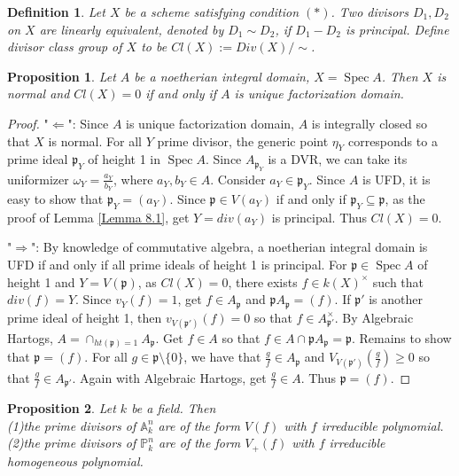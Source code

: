 \documentclass{ctexart}
\newtheorem{definition}{Definition}[section]
\newtheorem{proposition}{Proposition}[section]
\newcommand{\spec}{\operatorname{Spec}}
\begin{document}
\begin{definition}
    Let $X$ be a scheme satisfying condition $(\ast)$.
    Two divisors $D_{1}, D_{2}$ on $X$ are linearly equivalent, denoted by $D_{1} \sim D_{2}$, if $D_{1} - D_{2}$ is principal.
    Define divisor class group of $X$ to be $Cl(X) := Div(X)/\sim$.
\end{definition}
\begin{proposition}
    Let $A$ be a noetherian integral domain, $X = \spec A$.
    Then $X$ is normal and $Cl(X) = 0$ if and only if $A$ is unique factorization domain.
    \label{Proposition 8.1}
\end{proposition}
\begin{proof}
    "$\Leftarrow$": Since $A$ is unique factorization domain, $A$ is integrally closed so that $X$ is normal.
    For all $Y$ prime divisor, the generic point $\eta_{Y}$ corresponds to a prime ideal $\mathfrak{p}_{Y}$ of height 1 in $\spec A$.
    Since $A_{\mathfrak{p}_{Y}}$ is a DVR, we can take its uniformizer $\omega_{Y} = \frac{a_{Y}}{b_{Y}}$, where $a_{Y},b_{Y}\in A$.
    Consider $a_{Y}\in \mathfrak{p}_{Y}$.
    Since $A$ is UFD, it is easy to show that $\mathfrak{p}_{Y} = (a_{Y})$.
    Since $\mathfrak{p}\in V(a_{Y})$ if and only if $\mathfrak{p}_{Y} \subseteq \mathfrak{p}$,
    as the proof of Lemma \ref{Lemma 8.1}, get $Y = div(a_{Y})$ is principal.
    Thus $Cl(X) = 0$.
    \par
    "$\Rightarrow$": By knowledge of commutative algebra, a noetherian integral domain is UFD if and only if all prime ideals of height 1 is principal.
    For $\mathfrak{p}\in \spec A$ of height 1 and $Y = V(\mathfrak{p})$, as $Cl(X) = 0$, 
    there exists $f\in k(X)^{\times}$ such that $div(f) = Y$.
    Since $v_{Y}(f) = 1$, get $f\in A_{\mathfrak{p}}$ and $\mathfrak{p}A_{\mathfrak{p}} = (f)$.
    If $\mathfrak{p}'$ is another prime ideal of height 1, then $v_{V(\mathfrak{p}')}(f) = 0$ so that $f\in A_{\mathfrak{p}'}^{\times}$.
    By Algebraic Hartogs, $A = \cap_{ht(\mathfrak{p}) = 1} A_{\mathfrak{p}}$.
    Get $f\in A$ so that $f\in A \cap \mathfrak{p}A_{\mathfrak{p}} = \mathfrak{p}$.
    Remains to show that $\mathfrak{p} = (f)$.
    For all $g\in \mathfrak{p} \setminus \{0\}$, we have that $\frac{g}{f}\in A_{\mathfrak{p}}$ and $V_{V(\mathfrak{p}')}(\frac{g}{f}) \ge 0$ so that $\frac{g}{f}\in A_{\mathfrak{p}'}$.
    Again with Algebraic Hartogs, get $\frac{g}{f}\in A$.
    Thus $\mathfrak{p} = (f)$.
\end{proof}
\begin{proposition}
    Let $k$ be a field.
    Then \\ 
    (1)the prime divisors of $\mathbb{A}_{k}^{n}$ are of the form $V(f)$ with $f$ irreducible polynomial. \\
    (2)the prime divisors of $\mathbb{P}_{k}^{n}$ are of the form $V_{+}(f)$ with $f$ irreducible homogeneous polynomial.
    \label{Proposition 8.2}
\end{proposition}
\end{document}
